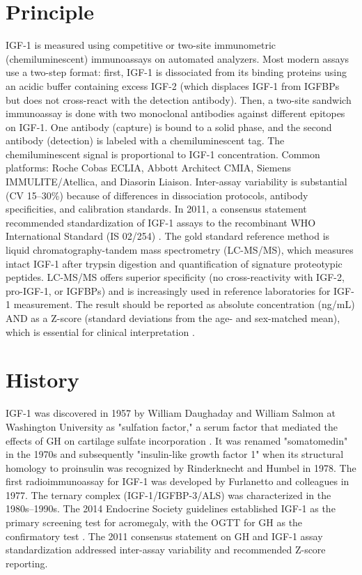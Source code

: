 \section*{Principle}
IGF-1 is measured using competitive or two-site immunometric (chemiluminescent) immunoassays on automated analyzers. Most modern assays use a two-step format: first, IGF-1 is dissociated from its binding proteins using an acidic buffer containing excess IGF-2 (which displaces IGF-1 from IGFBPs but does not cross-react with the detection antibody). Then, a two-site sandwich immunoassay is done with two monoclonal antibodies against different epitopes on IGF-1. One antibody (capture) is bound to a solid phase, and the second antibody (detection) is labeled with a chemiluminescent tag. The chemiluminescent signal is proportional to IGF-1 concentration. Common platforms: Roche Cobas ECLIA, Abbott Architect CMIA, Siemens IMMULITE/Atellica, and Diasorin Liaison. Inter-assay variability is substantial (CV 15--30\%) because of differences in dissociation protocols, antibody specificities, and calibration standards. In 2011, a consensus statement recommended standardization of IGF-1 assays to the recombinant WHO International Standard (IS 02/254) \cite{clemmons2011consensus}. The gold standard reference method is liquid chromatography-tandem mass spectrometry (LC-MS/MS), which measures intact IGF-1 after trypsin digestion and quantification of signature proteotypic peptides. LC-MS/MS offers superior specificity (no cross-reactivity with IGF-2, pro-IGF-1, or IGFBPs) and is increasingly used in reference laboratories for IGF-1 measurement. The result should be reported as absolute concentration (ng/mL) AND as a Z-score (standard deviations from the age- and sex-matched mean), which is essential for clinical interpretation \cite{tietz2023textbook}.

\section*{History}
IGF-1 was discovered in 1957 by William Daughaday and William Salmon at Washington University as "sulfation factor," a serum factor that mediated the effects of GH on cartilage sulfate incorporation \cite{salmon1957hormonally}. It was renamed "somatomedin" in the 1970s and subsequently "insulin-like growth factor 1" when its structural homology to proinsulin was recognized by Rinderknecht and Humbel in 1978. The first radioimmunoassay for IGF-1 was developed by Furlanetto and colleagues in 1977. The ternary complex (IGF-1/IGFBP-3/ALS) was characterized in the 1980s--1990s. The 2014 Endocrine Society guidelines established IGF-1 as the primary screening test for acromegaly, with the OGTT for GH as the confirmatory test \cite{katznelson2014acromegaly}. The 2011 consensus statement on GH and IGF-1 assay standardization addressed inter-assay variability and recommended Z-score reporting.

